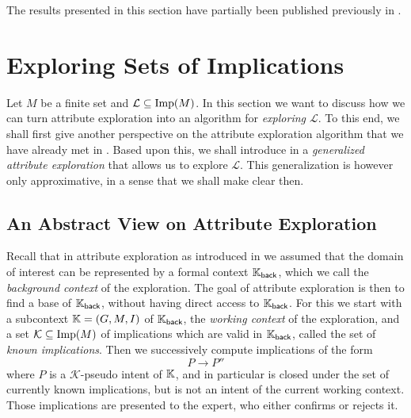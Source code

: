 The results presented in this section have partially been published previously in
\cite{Borch-LTCS-13-04}.

\section{Exploring Sets of Implications}
\label{sec:an-abstract-view}

Let $M$ be a finite set and $\mathcal{L} \subseteq \operatorname{Imp}(M)$.  In this section we want to
discuss how we can turn attribute exploration into an algorithm for \emph{exploring
  $\mathcal{L}$}.  To this end, we shall first give another perspective on the attribute
exploration algorithm that we have already met in .  Based upon this,
we shall introduce in  a \emph{generalized attribute
  exploration} that allows us to explore $\mathcal{L}$.  This generalization is however
only approximative, in a sense that we shall make clear then.

\subsection{An Abstract View on Attribute Exploration}
\label{sec:class-attr-expl}

Recall that in attribute exploration as introduced in  we assumed that
the domain of interest can be represented by a formal context ${\mathbb{K}}_{\mathsf{back}}$,
which we call the \emph{background context} of the exploration.  The goal of attribute
exploration is then to find a base of ${\mathbb{K}}_{\mathsf{back}}$, without having direct
access to ${\mathbb{K}}_{\mathsf{back}}$.  For this we start with a subcontext ${\mathbb{K}} = (G, M,
I)$ of ${\mathbb{K}}_{\mathsf{back}}$, the \emph{working context} of the exploration, and a set
$\mathcal{K} \subseteq \operatorname{Imp}(M)$ of implications which are valid in ${\mathbb{K}}_{\mathsf{back}}$, called the set of \emph{known implications}.  Then we successively
compute implications of the form
\begin{equation*}
  P \to P''
\end{equation*}
where $P$ is a $\mathcal{K}$-pseudo intent of ${\mathbb{K}}$, and in particular is closed under
the set of currently known implications, but is not an intent of the current working
context.  Those implications are presented to the expert, who either confirms or rejects
it.

